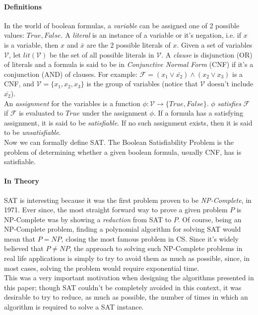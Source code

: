 \documentclass[]{article}
\begin{document}
\paragraph{Definitions}
In the world of boolean formulas, a \textit{variable} can be assigned one of 2 possible values: $ True, False $. A \textit{literal} is an instance of a variable or it's negation, i.e. if $ x $ is a variable, then $ x $ and $ \bar{x} $ are the 2 possible literals of $ x $. Given a set of variables $ \mathcal{V} $, let $ lit(\mathcal{V}) $ be the set of all possible literals in $ \mathcal{V} $. A \textit{clause} is disjunction (OR) of literals and a formula is said to be in \textit{Conjunctive Normal Form} (CNF) if it's a conjunction (AND) of clauses. For example: $\mathcal{F} = (x_1 \lor \bar{x_2}) \land (x_2 \lor x_3) $ is a CNF, and $ \mathcal{V}=\{x_1,x_2,x_3\} $ is the group of variables (notice that $ \mathcal{V} $ doesn't include $ \bar{x_2} $). \\ An \textit{assignment} for the variables is a function $ \phi : \mathcal{V} \rightarrow \{True, False\} $. $ \phi $ \textit{satisfies} $ \mathcal{F} $ if $ \mathcal{F} $ is evaluated to $ True $ under the assignment $ \phi $. If a formula has a satisfying assignment, it is said to be \textit{satisfiable}. If no such assignment exists, then it is said to be \textit{unsatisfiable}. \\
Now we can formally define SAT. The Boolean Satisfiability Problem is the problem of determining whether a given boolean formula, usually CNF, has is satisfiable.
\paragraph{In Theory} SAT is interesting because it was the first problem proven to be \textit{NP-Complete}, in 1971. Ever since, the most straight forward way to prove a given problem $ P $ is NP-Complete was by showing a \textit{reduction} from SAT to $ P $. Of course, being an NP-Complete problem, finding a polynomial algorithm for solving SAT would mean that $ P=NP $, closing the most famous problem in CS. Since it's widely believed that $ P \neq NP $, the approach to solving such NP-Complete problems in real life applications is simply to try to avoid them as much as possible, since, in most cases, solving the problem would require exponential time. \\
This was a very important motivation when designing the algorithms presented in this paper; though SAT couldn't be completely avoided in this context, it was desirable to try to reduce, as much as possible, the number of times in which an algorithm is required to solve a SAT instance.
\end{document}
